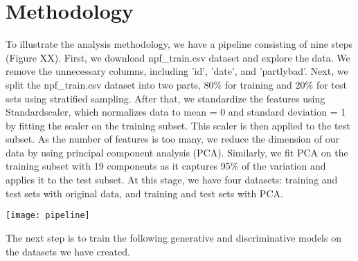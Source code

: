 \chapter{Methodology}


To illustrate the analysis methodology, we have a pipeline consisting of nine steps (Figure XX). First, we download npf\_train.csv dataset and explore the data. We remove the unnecessary columns, including 'id', 'date', and 'partlybad'. Next, we split the npf\_train.csv dataset into two parts, 80\% for training and 20\% for test sets using stratified sampling. After that, we standardize the features using Standardscaler, which normalizes data to mean = 0 and standard deviation = 1 by fitting the scaler on the training subset. This scaler is then applied to the test subset. As the number of features is too many, we reduce the dimension of our data by using principal component analysis (PCA). Similarly, we fit PCA on the training subset with 19 components as it captures 95\% of the variation and applies it to the test subset. At this stage, we have four datasets: training and test sets with original data, and training and test sets with PCA. 

\texttt{[image: pipeline]}

The next step is to train the following generative and discriminative models on the datasets we have created.

